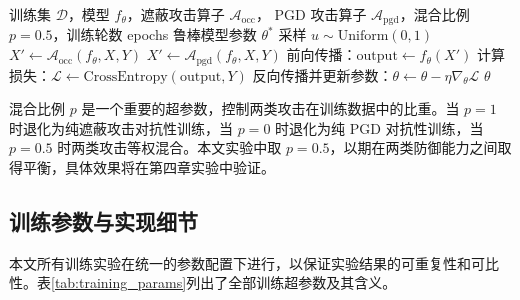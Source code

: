 \begin{algorithm}[htbp]
  \caption{混合对抗性训练（Mix AT）}
  \label{alg:mat}
  \begin{algorithmic}[1]
    \Require 训练集 $\mathcal{D}$，模型 $f_{\theta}$，遮蔽攻击算子 $\mathcal{A}_{\text{occ}}$，
             PGD 攻击算子 $\mathcal{A}_{\text{pgd}}$，混合比例 $p=0.5$，训练轮数 epochs
    \Ensure 鲁棒模型参数 $\theta^*$
        \State 采样 $u \sim \mathrm{Uniform}(0, 1)$
          \State $X' \leftarrow \mathcal{A}_{\text{occ}}(f_{\theta}, X, Y)$
        \Else
          \State $X' \leftarrow \mathcal{A}_{\text{pgd}}(f_{\theta}, X, Y)$
        \EndIf
        \State 前向传播：$\mathrm{output} \leftarrow f_{\theta}(X')$
        \State 计算损失：$\mathcal{L} \leftarrow \mathrm{CrossEntropy}(\mathrm{output}, Y)$
        \State 反向传播并更新参数：$\theta \leftarrow \theta - \eta \nabla_{\theta} \mathcal{L}$
      \EndFor
    \EndFor
    \State \Return $\theta$
  \end{algorithmic}
\end{algorithm}

混合比例 $p$ 是一个重要的超参数，控制两类攻击在训练数据中的比重。当 $p=1$ 时退化为纯遮蔽攻击对抗性训练，当 $p=0$ 时退化为纯 PGD 对抗性训练，当 $p=0.5$ 时两类攻击等权混合。本文实验中取 $p=0.5$，以期在两类防御能力之间取得平衡，具体效果将在第四章实验中验证。

\subsection{训练参数与实现细节}

本文所有训练实验在统一的参数配置下进行，以保证实验结果的可重复性和可比性。表\ref{tab:training_params}列出了全部训练超参数及其含义。

